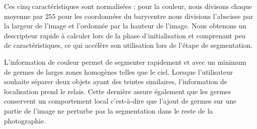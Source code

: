 Ces cinq caractéristiques sont normalisées : pour la couleur, nous divisons chaque moyenne par $255$ \modif{;} pour les coordonnées du barycentre\modif{,} nous divisions l'abscisse par la largeur de l'image et l'ordonnée par la hauteur de l'image. Nous obtenons un descripteur rapide à calculer lors de la phase d'initialisation et comprenant peu de caractéristiques, ce qui accélère son utilisation lors de l'étape de segmentation.  

L'information de couleur permet de segmenter rapidement et avec un minimum de germes de larges zones homogènes telles que le ciel. Lorsque l'utilisateur souhaite séparer deux objets ayant des teintes similaires, l'information de localisation prend le relais. Cette dernière assure également que les germes conservent un comportement local c'est-à-dire que l'ajout de germes sur une partie de l'image ne perturbe pas la segmentation dans le reste de la photographie.


